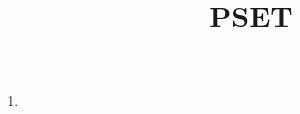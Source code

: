 \documentclass{article}
\title{PSET}
\date{}
\begin{document}
\matetitle

\begin{enumerate}
	\item
\end{enumerate}
\end{document}
